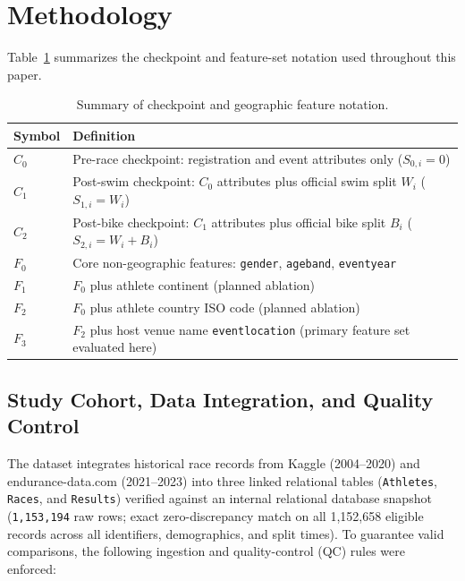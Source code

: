 \documentclass[11pt,a4paper]{article}
\begin{document}
\section{Methodology}

Table~\ref{tab:notation} summarizes the checkpoint and feature-set
notation used throughout this paper.

\begin{table}[htbp]
\centering
\small
\caption{Summary of checkpoint and geographic feature notation.}
\label{tab:notation}
\renewcommand{\arraystretch}{1.15}
\begin{tabularx}{\textwidth}{l X}
\toprule
\textbf{Symbol} & \textbf{Definition} \\
\midrule
$C_0$ & Pre-race checkpoint: registration and event attributes only ($S_{0,i} = 0$) \\
$C_1$ & Post-swim checkpoint: $C_0$ attributes plus official swim split $W_i$ ($S_{1,i} = W_i$) \\
$C_2$ & Post-bike checkpoint: $C_1$ attributes plus official bike split $B_i$ ($S_{2,i} = W_i + B_i$) \\
$F_0$ & Core non-geographic features: \texttt{gender}, \texttt{ageband}, \texttt{eventyear} \\
$F_1$ & $F_0$ plus athlete continent (planned ablation) \\
$F_2$ & $F_0$ plus athlete country ISO code (planned ablation) \\
$F_3$ & $F_2$ plus host venue name \texttt{eventlocation} (primary feature set evaluated here) \\
\bottomrule
\end{tabularx}
\end{table}

\subsection{Study Cohort, Data Integration, and Quality Control}

The dataset integrates historical race records from Kaggle
(2004--2020) and endurance-data.com (2021--2023) into three linked
relational tables (\texttt{Athletes}, \texttt{Races}, and
\texttt{Results}) verified against an internal relational database
snapshot (\texttt{1,153,194} raw rows; exact zero-discrepancy match on all
1{,}152{,}658 eligible records across all identifiers, demographics, and
split times). To guarantee valid comparisons, the following ingestion
and quality-control (QC) rules were enforced:
\end{document}
